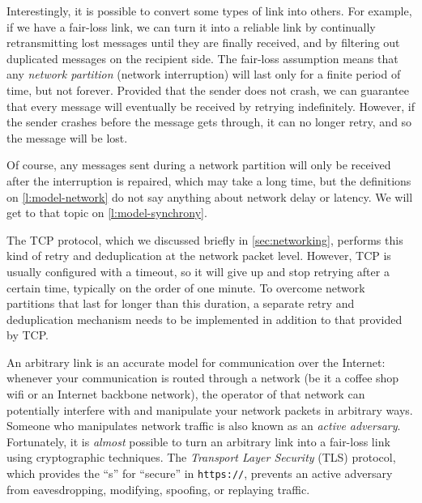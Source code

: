 Interestingly, it is possible to convert some types of link into others.
For example, if we have a fair-loss link, we can turn it into a reliable link by continually retransmitting lost messages until they are finally received, and by filtering out duplicated messages on the recipient side.
The fair-loss assumption means that any \emph{network partition} (network interruption) will last only for a finite period of time, but not forever.
Provided that the sender does not crash, we can guarantee that every message will eventually be received by retrying indefinitely.
However, if the sender crashes before the message gets through, it can no longer retry, and so the message will be lost.

Of course, any messages sent during a network partition will only be received after the interruption is repaired, which may take a long time, but the definitions on \autoref{l:model-network} do not say anything about network delay or latency.
We will get to that topic on \autoref{l:model-synchrony}.

The TCP protocol, which we discussed briefly in \autoref{sec:networking}, performs this kind of retry and deduplication at the network packet level.
However, TCP is usually configured with a timeout, so it will give up and stop retrying after a certain time, typically on the order of one minute.
To overcome network partitions that last for longer than this duration, a separate retry and deduplication mechanism needs to be implemented in addition to that provided by TCP.


An arbitrary link is an accurate model for communication over the Internet: whenever your communication is routed through a network (be it a coffee shop wifi or an Internet backbone network), the operator of that network can potentially interfere with and manipulate your network packets in arbitrary ways.
Someone who manipulates network traffic is also known as an \emph{active adversary}.
Fortunately, it is \emph{almost} possible to turn an arbitrary link into a fair-loss link using cryptographic techniques.
The \emph{Transport Layer Security} (TLS) protocol, which provides the ``s'' for ``secure'' in \verb|https://|, prevents an active adversary from eavesdropping, modifying, spoofing, or replaying traffic.

